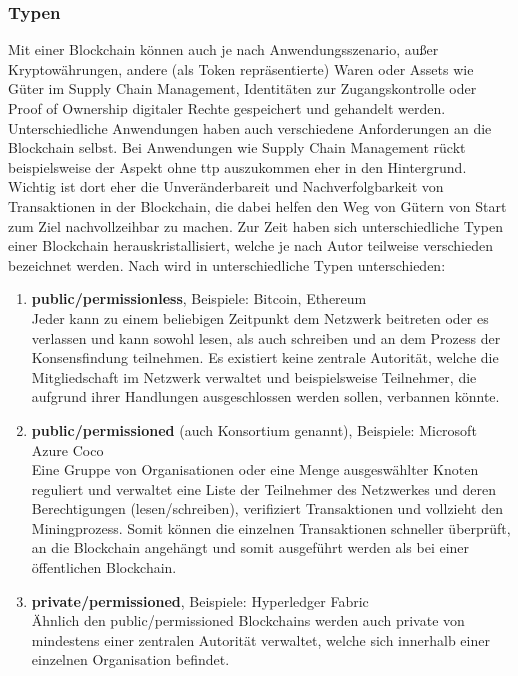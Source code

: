 	\subsubsection{Typen}
    \label{sec:sota_blockchain_types}
        Mit einer Blockchain können auch je nach Anwendungsszenario, außer Kryptowährungen, andere (als Token  repräsentierte) Waren oder Assets wie Güter im Supply Chain Management\cite{Underwood2016}, Identitäten zur Zugangskontrolle\cite{Kshetri2017} oder Proof of Ownership digitaler Rechte\cite{Wuest2017} gespeichert und gehandelt werden. 
        Unterschiedliche Anwendungen haben auch verschiedene Anforderungen an die Blockchain selbst. 
        Bei Anwendungen wie Supply Chain Management rückt beispielsweise der Aspekt ohne \gls{ttp} auszukommen eher in den Hintergrund. 
        Wichtig ist dort eher die Unveränderbareit und Nachverfolgbarkeit von Transaktionen in der Blockchain, die dabei helfen den Weg von Gütern von Start zum Ziel nachvollzeihbar zu machen. 
        Zur Zeit haben sich unterschiedliche Typen einer Blockchain herauskristallisiert, welche je nach Autor teilweise verschieden bezeichnet werden.
        Nach \cite{Wuest2017,Christidis2016,Buterin2015,Vukolic2017} wird in unterschiedliche Typen unterschieden:
        \begin{enumerate}[noitemsep]
            \item \textbf{public/permissionless}, Beispiele: Bitcoin, Ethereum\\
                Jeder kann zu einem beliebigen Zeitpunkt dem Netzwerk beitreten oder es verlassen und kann sowohl lesen, als auch schreiben und an dem Prozess der Konsensfindung teilnehmen. 
                Es existiert keine zentrale Autorität, welche die Mitgliedschaft im Netzwerk verwaltet und beispielsweise Teilnehmer, die aufgrund ihrer Handlungen ausgeschlossen werden sollen, verbannen könnte. 
            \item \textbf{public/permissioned} (auch Konsortium genannt), Beispiele: Microsoft Azure Coco\\
                Eine Gruppe von Organisationen oder eine Menge ausgeswählter Knoten reguliert und verwaltet eine Liste der Teilnehmer des Netzwerkes und deren Berechtigungen (lesen/schreiben), verifiziert Transaktionen und vollzieht den Miningprozess. 
                Somit können die einzelnen Transaktionen schneller überprüft, an die Blockchain angehängt und somit ausgeführt werden als bei einer öffentlichen Blockchain.
            \item \textbf{private/permissioned}, Beispiele: Hyperledger Fabric\\
                Ähnlich den public/permissioned Blockchains werden auch private von mindestens einer zentralen Autorität verwaltet, welche sich innerhalb einer einzelnen Organisation befindet.
        \end{enumerate}
	
